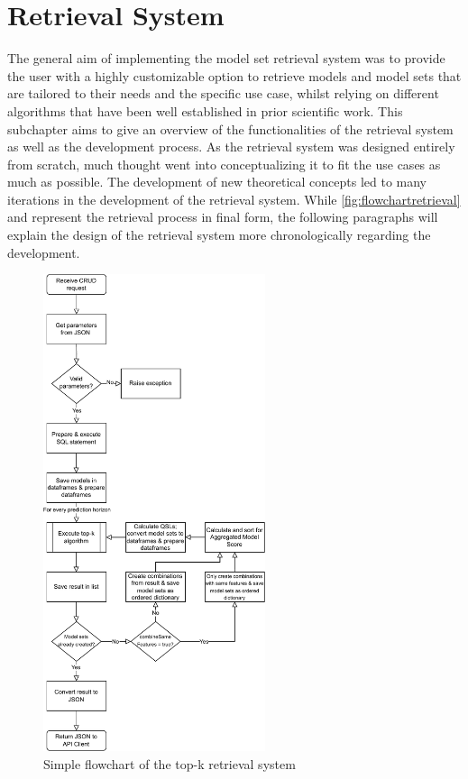 \section{Retrieval System}\label{sec:designretrieval}

The general aim of implementing the model set retrieval system was to provide the user with a highly customizable option to retrieve models and model sets that are tailored to their needs and the specific use case, whilst relying on different algorithms that have been well established in prior scientific work. This subchapter aims to give an overview of the functionalities of the retrieval system as well as the development process. As the retrieval system was designed entirely from scratch, much thought went into conceptualizing it to fit the use cases as much as possible. The development of new theoretical concepts led to many iterations in the development of the retrieval system. While \autoref{fig:flowchartretrieval} and  represent the retrieval process in final form, the following paragraphs will explain the design of the retrieval system more chronologically regarding the development. %

\begin{figure}[htbp]
  \centering
\includegraphics[height=14cm]{graphics/flowchartretrieval.pdf}
  \caption{Simple flowchart of the top-k retrieval system}
  \label{fig:flowchartretrieval}
\end{figure}

